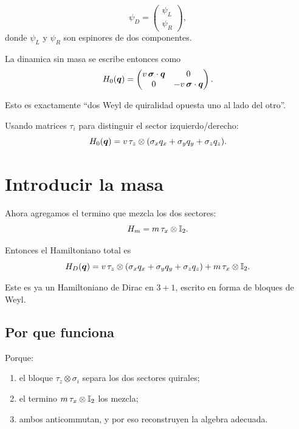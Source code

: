 \begin{equation}
\psi_D=
\begin{pmatrix}
\psi_L\\
\psi_R
\end{pmatrix},
\end{equation}
donde \(\psi_L\) y \(\psi_R\) son espinores de dos componentes.

La dinamica sin masa se escribe entonces como
\begin{equation}
H_0(\bm{q})=
\begin{pmatrix}
v\,\bm{\sigma}\cdot \bm{q} & 0\\
0 & -v\,\bm{\sigma}\cdot \bm{q}
\end{pmatrix}.
\label{c07:eq:block-weyl}
\end{equation}

Esto es exactamente \enquote{dos Weyl de quiralidad opuesta uno al lado del otro}.

Usando matrices \(\tau_i\) para distinguir el sector izquierdo/derecho:
\begin{equation}
H_0(\bm{q})=v\,\tau_z\otimes(\sigma_x q_x+\sigma_y q_y+\sigma_z q_z).
\label{c07:eq:block-tauz}
\end{equation}

\section{Introducir la masa}

Ahora agregamos el termino que mezcla los dos sectores:
\begin{equation}
H_m = m\,\tau_x\otimes \mathbb{I}_2.
\label{c07:eq:mass-term}
\end{equation}

Entonces el Hamiltoniano total es
\begin{equation}
H_D(\bm{q})=
v\,\tau_z\otimes(\sigma_x q_x+\sigma_y q_y+\sigma_z q_z)
 + m\,\tau_x\otimes \mathbb{I}_2.
\label{c07:eq:dirac-block}
\end{equation}

Este es ya un Hamiltoniano de Dirac en \(3+1\), escrito en forma de bloques de Weyl.

\subsection{Por que funciona}

Porque:

\begin{enumerate}[leftmargin=*]
  \item el bloque \(\tau_z\otimes \sigma_i\) separa los dos sectores quirales;
  \item el termino \(m\,\tau_x\otimes \mathbb{I}_2\) los mezcla;
  \item ambos anticommutan, y por eso reconstruyen la algebra adecuada.
\end{enumerate}

